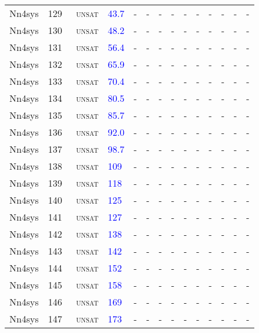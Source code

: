 \begin{center}
{\begin{longtable}{@{}llllllllllllll@{}}
Nn4sys & 129 & ~\textsc{unsat} & \textcolor{blue}{43.7} & - & - & - & - & - & - & - & - & - & - \\
Nn4sys & 130 & ~\textsc{unsat} & \textcolor{blue}{48.2} & - & - & - & - & - & - & - & - & - & - \\
Nn4sys & 131 & ~\textsc{unsat} & \textcolor{blue}{56.4} & - & - & - & - & - & - & - & - & - & - \\
Nn4sys & 132 & ~\textsc{unsat} & \textcolor{blue}{65.9} & - & - & - & - & - & - & - & - & - & - \\
Nn4sys & 133 & ~\textsc{unsat} & \textcolor{blue}{70.4} & - & - & - & - & - & - & - & - & - & - \\
Nn4sys & 134 & ~\textsc{unsat} & \textcolor{blue}{80.5} & - & - & - & - & - & - & - & - & - & - \\
Nn4sys & 135 & ~\textsc{unsat} & \textcolor{blue}{85.7} & - & - & - & - & - & - & - & - & - & - \\
Nn4sys & 136 & ~\textsc{unsat} & \textcolor{blue}{92.0} & - & - & - & - & - & - & - & - & - & - \\
Nn4sys & 137 & ~\textsc{unsat} & \textcolor{blue}{98.7} & - & - & - & - & - & - & - & - & - & - \\
Nn4sys & 138 & ~\textsc{unsat} & \textcolor{blue}{109} & - & - & - & - & - & - & - & - & - & - \\
Nn4sys & 139 & ~\textsc{unsat} & \textcolor{blue}{118} & - & - & - & - & - & - & - & - & - & - \\
Nn4sys & 140 & ~\textsc{unsat} & \textcolor{blue}{125} & - & - & - & - & - & - & - & - & - & - \\
Nn4sys & 141 & ~\textsc{unsat} & \textcolor{blue}{127} & - & - & - & - & - & - & - & - & - & - \\
Nn4sys & 142 & ~\textsc{unsat} & \textcolor{blue}{138} & - & - & - & - & - & - & - & - & - & - \\
Nn4sys & 143 & ~\textsc{unsat} & \textcolor{blue}{142} & - & - & - & - & - & - & - & - & - & - \\
Nn4sys & 144 & ~\textsc{unsat} & \textcolor{blue}{152} & - & - & - & - & - & - & - & - & - & - \\
Nn4sys & 145 & ~\textsc{unsat} & \textcolor{blue}{158} & - & - & - & - & - & - & - & - & - & - \\
Nn4sys & 146 & ~\textsc{unsat} & \textcolor{blue}{169} & - & - & - & - & - & - & - & - & - & - \\
Nn4sys & 147 & ~\textsc{unsat} & \textcolor{blue}{173} & - & - & - & - & - & - & - & - & - & - \\

\end{longtable}}
\end{center}
